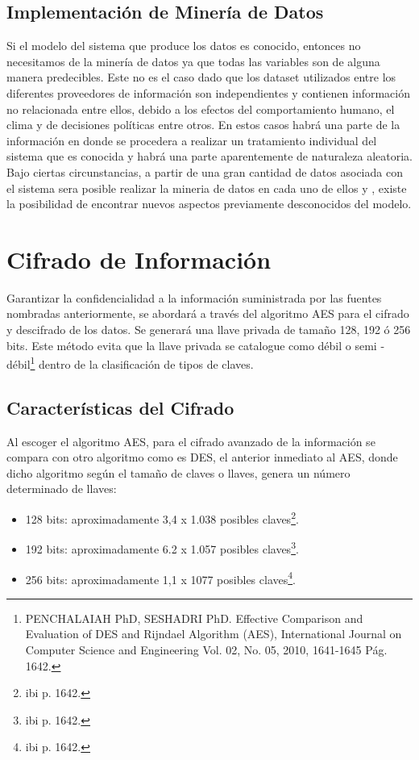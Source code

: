\documentclass[a4paper,openright,12pt]{book}
\theoremstyle{definition}
\theoremstyle{remark}
\begin{document}
     \subsection{Implementación de Minería de Datos}
Si el modelo del sistema que produce los datos es conocido, entonces no necesitamos de la minería de datos ya que todas las variables son de alguna manera predecibles. Este no es el caso dado que los dataset utilizados entre los diferentes proveedores de información son independientes y contienen información no relacionada entre ellos, debido a los efectos del
comportamiento humano, el clima y de decisiones políticas
entre otros. En estos casos habrá una parte de la información en donde se procedera a realizar un tratamiento individual del sistema que es
conocida y habrá una parte aparentemente de naturaleza
aleatoria. Bajo ciertas circunstancias, a partir de una gran
cantidad de datos asociada con el sistema sera posible realizar la mineria de datos en cada uno de ellos y , existe la
posibilidad de encontrar nuevos aspectos previamente
desconocidos del modelo. 
\section{Cifrado de Información}
Garantizar la confidencialidad a la información suministrada por las fuentes nombradas anteriormente, se abordará a través del algoritmo AES para el cifrado y descifrado de los datos. Se generará una llave privada de tamaño 128, 192 ó 256 bits. Este método evita que la llave privada se catalogue como débil o semi - débil\footnote{PENCHALAIAH PhD, SESHADRI  PhD. Effective Comparison and Evaluation of DES and Rijndael Algorithm (AES), International Journal on Computer Science and Engineering Vol. 02, No. 05, 2010, 1641-1645 Pág. 1642.} dentro de la clasificación de tipos de claves.
    \subsection{Características del Cifrado}
    Al escoger el algoritmo AES, para el cifrado avanzado de la información se compara con otro algoritmo como es DES, el anterior inmediato al AES, donde dicho algoritmo según el tamaño de claves o llaves, genera un número determinado de llaves:
\begin{itemize}
	\item 128 bits: aproximadamente 3,4 x 1.038 posibles claves\footnote{ibi p. 1642.}.
    \item 192 bits: aproximadamente 6.2 x 1.057 posibles claves\footnote{ibi p. 1642.}.
    \item 256 bits: aproximadamente 1,1 x 1077 posibles claves\footnote{ibi p. 1642.}.
\end{itemize}
\end{document}

